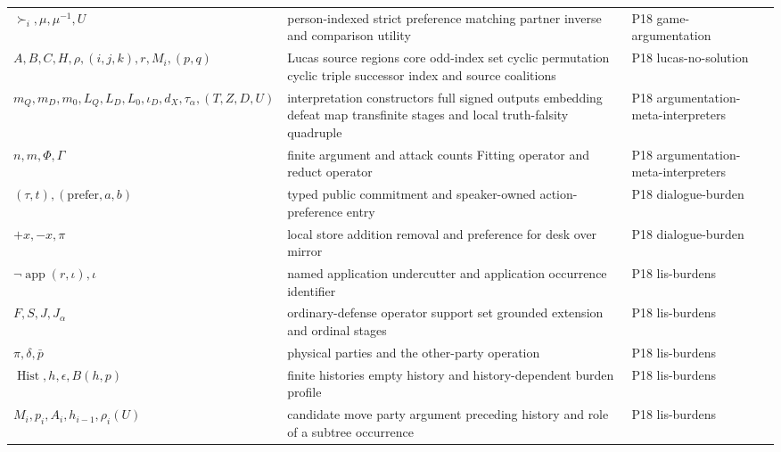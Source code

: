 \begin{longtable}{@{}p{}p{}p{}@{}}
\(\succ_i,\allowbreak \mu,\allowbreak \mu^{-1},\allowbreak U\) & person-indexed strict preference matching partner inverse and comparison utility & P18 game-\allowbreak{}argumentation \\
\(A,\allowbreak B,\allowbreak C,\allowbreak H,\allowbreak \rho,\allowbreak (i,\allowbreak j,\allowbreak k),\allowbreak r,\allowbreak M_i,\allowbreak (p,\allowbreak q)\) & Lucas source regions core odd-index set cyclic permutation cyclic triple successor index and source coalitions & P18 lucas-\allowbreak{}no-\allowbreak{}solution \\
\(m_Q,\allowbreak m_D,\allowbreak m_0,\allowbreak L_Q,\allowbreak L_D,\allowbreak L_0,\allowbreak \iota_D,\allowbreak d_X,\allowbreak \tau_\alpha,\allowbreak (T,\allowbreak Z,\allowbreak D,\allowbreak U)\) & interpretation constructors full signed outputs embedding defeat map transfinite stages and local truth-falsity quadruple & P18 argumentation-\allowbreak{}meta-\allowbreak{}interpreters \\
\(n,\allowbreak m,\allowbreak \Phi,\allowbreak \Gamma\) & finite argument and attack counts Fitting operator and reduct operator & P18 argumentation-\allowbreak{}meta-\allowbreak{}interpreters \\
\((\tau,\allowbreak t),\allowbreak (\mathrm{prefer},\allowbreak a,\allowbreak b)\) & typed public commitment and speaker-owned action-preference entry & P18 dialogue-\allowbreak{}burden \\
\(+x,\allowbreak -x,\allowbreak \pi\) & local store addition removal and preference for desk over mirror & P18 dialogue-\allowbreak{}burden \\
\(\neg\operatorname{app}(r,\allowbreak \iota),\allowbreak \iota\) & named application undercutter and application occurrence identifier & P18 lis-\allowbreak{}burdens \\
\(F,\allowbreak S,\allowbreak J,\allowbreak J_\alpha\) & ordinary-defense operator support set grounded extension and ordinal stages & P18 lis-\allowbreak{}burdens \\
\(\pi,\allowbreak \delta,\allowbreak \bar p\) & physical parties and the other-party operation & P18 lis-\allowbreak{}burdens \\
\(\operatorname{Hist},\allowbreak h,\allowbreak \epsilon,\allowbreak B(h,\allowbreak p)\) & finite histories empty history and history-dependent burden profile & P18 lis-\allowbreak{}burdens \\
\(M_i,\allowbreak p_i,\allowbreak A_i,\allowbreak h_{i-1},\allowbreak \rho_i(U)\) & candidate move party argument preceding history and role of a subtree occurrence & P18 lis-\allowbreak{}burdens \\

\end{longtable}
